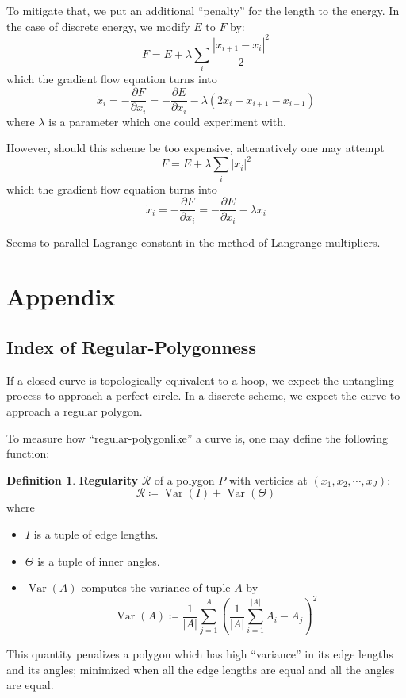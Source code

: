 \documentclass[a4paper, 11pt]{article}
\DeclareMathOperator{\Var}{Var}
\theoremstyle{definition}
\newtheorem{definition}{Definition}
\theoremstyle{remark}
\begin{document}
To mitigate that, we put an additional ``penalty'' for the length to the energy.
In the case of discrete energy, we modify $E$ to $F$ by:
\begin{equation}
    F = E + \lambda \sum_i \frac{|x_{i+1} - x_i|^2}{2}
\end{equation}
which the gradient flow equation turns into
\begin{equation}
    \dot{x}_i = - \frac{\partial F}{\partial x_i} =  - \frac{\partial E}{\partial x_i} - \lambda \left( 2 x_i - x_{i+1} - x_{i-1} \right)
\end{equation}
where $\lambda$ is a parameter which one could experiment with.

However, should this scheme be too expensive, alternatively one may attempt
\begin{equation}
    F = E + \lambda \sum_i |x_i|^2
\end{equation}
which the gradient flow equation turns into
\begin{equation}
    \dot{x}_i = - \frac{\partial F}{\partial x_i} =  - \frac{\partial E}{\partial x_i} - \lambda x_i
\end{equation}


Seems to parallel Lagrange constant in the method of Langrange multipliers.
\section{Appendix}
\subsection{Index of Regular-Polygonness}
If a closed curve is topologically equivalent to a hoop, we expect the untangling process to approach a perfect circle.
In a discrete scheme, we expect the curve to approach a regular polygon.

To measure how ``regular-polygonlike'' a curve is, one may define the following function:
\begin{definition}
    \textbf{Regularity} $\mathcal{R}$ of a polygon $P$ with verticies at $\left( x_1, x_2, \cdots, x_J \right)$:
    \begin{equation}
        \mathcal{R} \coloneqq \Var \left( I \right) + \Var \left( \Theta \right)
    \end{equation}
    where
    \begin{itemize}
        \item $I$ is a tuple of edge lengths.
        \item $\Theta$ is a tuple of inner angles.
        \item $\Var (A)$ computes the variance of tuple $A$ by
            \begin{equation}
                \Var (A) \coloneqq \frac{1}{|A|} \sum_{j = 1}^{|A|} \left( \frac{1}{|A|} \sum_{i = 1}^{|A|} A_i - A_j \right)^2
            \end{equation}
    \end{itemize}
    This quantity penalizes a polygon which has high ``variance'' in its edge lengths and its angles;
    minimized when all the edge lengths are equal and all the angles are equal.
\end{definition}
\end{document}
